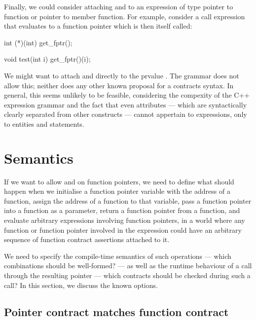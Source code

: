 Finally, we could consider attaching  and  to an expression of type pointer to function or pointer to member function. For example, consider a call expression that evaluates to a function pointer which is then itself called:

\begin{codeblock}
int (*)(int) get_fptr();

void test(int i) {
  get_fptr()(i);
}
\end{codeblock}
We might want to attach  and  directly to the prvalue . The \cite{P2900R9} grammar does not allow this; neither does any other known proposal for a contracts syntax. In general, this seems unlikely to be feasible, considering the compexity of the C++ expression grammar and the fact that even attributes --- which are syntactically clearly separated from other constructs --- cannot appertain to expressions, only to entities and statements.


\section{Semantics}
\label{semantics}

If we want to allow  and  on function pointers, we need to define what should happen when we initialise a function pointer variable with the address of a function, assign the address of a function to that variable, pass a function pointer into a function as a parameter, return a function pointer from a function, and evaluate arbitrary expressions involving function pointers, in a world where any function or function pointer involved in the expression could have an arbitrary sequence of function contract assertions attached to it.

We need to specify the compile-time semantics of such operations --- which combinations should be well-formed? --- as well as the runtime behaviour of a call through the resulting pointer --- which contracts should be checked during such a call? In this section, we discuss the known options.


\subsection{Pointer contract matches function contract}
\label{matching}

